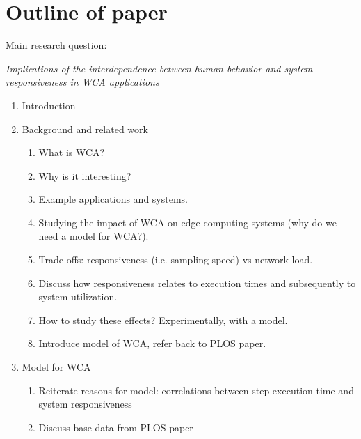\section{Outline of paper}

Main research question:

\emph{Implications of the interdependence between human behavior and system responsiveness in WCA applications}

\begin{enumerate}
    \item Introduction
    \item Background and related work
        \begin{enumerate}
            \item What is WCA?
            \item Why is it interesting?
            \item Example applications and systems.
            \item Studying the impact of WCA on edge computing systems (why do we need a model for WCA?).
            \item Trade-offs: responsiveness (i.e. sampling speed) vs network load.
            \item Discuss how responsiveness relates to execution times and subsequently to system utilization.
            \item How to study these effects? Experimentally, with a model.
            \item Introduce model of WCA, refer back to PLOS paper. 
        \end{enumerate}
    \item Model for WCA
        \begin{enumerate}
            \item Reiterate reasons for model: correlations between step execution time and system responsiveness
            \item Discuss base data from PLOS paper

\end{enumerate}
\end{enumerate}
